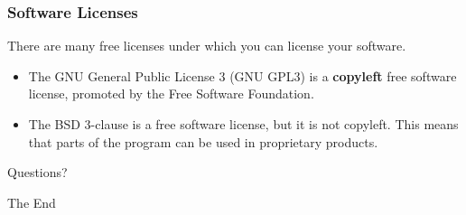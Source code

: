 \documentclass{beamer}
\begin{document}
\begin{frame}
\frametitle{Software Licenses}

There are many free licenses under which you can license your software.

\begin{itemize}
\item The GNU General Public License 3 (GNU GPL3) is a {\bf copyleft} 
  free software license, promoted by the Free Software Foundation.
\item The BSD 3-clause is a free software license, but it is not copyleft.
  This means that parts of the program can be used in proprietary products.
\end{itemize}

\end{frame}


\begin{frame}
\Huge{\centerline{Questions?}}
\end{frame}


\begin{frame}
\Huge{\centerline{The End}}
\end{frame}

\end{document}
